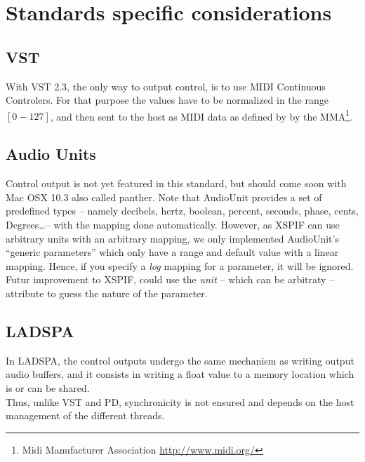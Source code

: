 
\chapter{Standards specific considerations}

\section{VST}
\noindent With VST 2.3, the only way to output control, is to use MIDI
Continuous Controlers. For that purpose the values have to be
normalized in the range $[0-127]$, and then sent to the host as MIDI
data as defined by by the MMA\footnote{Midi Manufacturer Association
  \url{http://www.midi.org/}}. 

\section{Audio Units}
\noindent Control output is not yet featured in this standard, but
should come soon with Mac OSX 10.3 also called panther. 
Note that AudioUnit provides a set of predefined types -- namely
decibels, hertz, boolean, percent, seconds, phase, cents,
Degrees\ldots-- with the mapping done automatically. However, as XSPIF
can use arbitrary units with an arbitrary mapping, we only implemented
AudioUnit's ``generic parameters'' which only have a range and default
value with a linear mapping. Hence, if you specify a \emph{log}
mapping for a parameter, it will be ignored. Futur improvement to
XSPIF, could use the \emph{unit} -- which can be arbitraty -- attribute to guess the nature of the parameter.


\section{LADSPA}
\noindent In LADSPA, the control outputs undergo the same mechanism as
writing output audio buffers, and it consists in writing a float value
to a memory location which is or can be shared.\\ 
\noindent Thus, unlike VST and PD,  synchronicity is not ensured and
depends on the host management of the different threads. 

